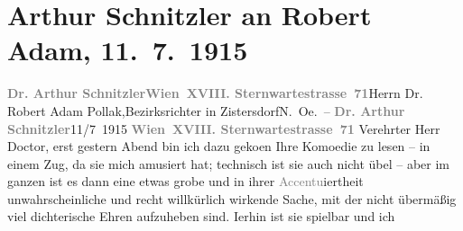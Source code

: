 

         
         \renewcommand{\erwaehntePersonen}{Personen: Robert Adam}
         \renewcommand{\erwaehnteOrte}{Orte: Kammerspiele Wien, Neue Wiener Bühne, Niederösterreich, Sternwartestraße, Wien, Zistersdorf}
         \renewcommand{\erwaehnteWerke}{Werke: Gesellschaft [Eine Gaunerkomödie]}
               \section[Arthur Schnitzler an Robert Adam, 11. 7. 1915]{ Arthur Schnitzler an Robert Adam, 11. 7. 1915}\nopagebreak{}\rehead{ }\begin{ledgroupsized}[t]{13cm}\normalsize\beginnumbering \toendnotes[C]{\smallbreak\pagebreak[2]} 
\toendnotes[C]{\smallbreak}\pstart{}{\pb}\textcolor{gray}{\textbf{Dr. Arthur Schnitzler}}\pend{}\pstart{}\textcolor{gray}{\textbf{Wien XVIII. Sternwartestrasse 71}}\pend{}{\bigskip}\pstart{}{\pb}Herrn Dr. Robert Adam Pollak,\pend{}\pstart{}Bezirksrichter in Zistersdorf\pend{}\pstart{}N. Oe. – \pend{}{\bigskip}\pstart
           \noindent{}{\pb}\textcolor{gray}{\textbf{Dr. Arthur Schnitzler}}\hfill 11/7 1915\pend
           \pstart
           \textcolor{gray}{\textbf{Wien XVIII. Sternwartestrasse 71}}\pend
           \pstart
           Verehrter Herr Doctor, erst gestern Abend bin ich dazu geko{\geminationm}en Ihre Komoedie zu lesen – in einem Zug, da sie mich amusiert hat;
               technisch ist sie auch nicht übel – aber im ganzen ist es dann eine etwas grobe und
               in ihrer \textcolor{gray}{Accentu}iertheit unwahrscheinliche und recht willkürlich
               wirkende Sache, mit der nicht übermäßig \introOben{}viel\introOben{} dichterische
               Ehren aufzuheben sind. I{\geminationm}erhin ist sie spielbar und ich

\end{ledgroupsized}
